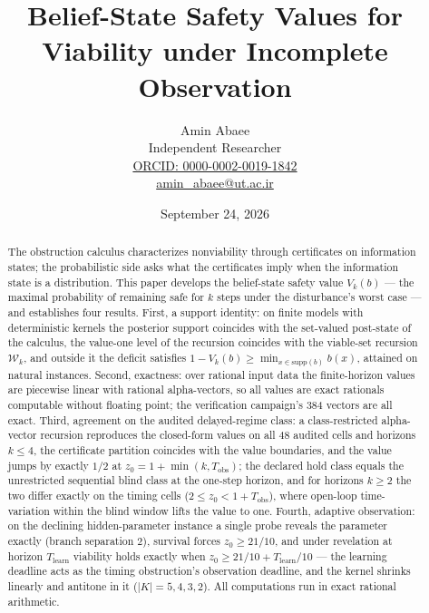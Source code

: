 \documentclass[10pt,twocolumn]{article}
\theoremstyle{plain}
\theoremstyle{definition}
\theoremstyle{remark}
\begin{document}
\title{Belief-State Safety Values for\\ Viability under Incomplete Observation}
\author{Amin Abaee\\[0.35em]
{\small Independent Researcher}\\[0.55em]
{\small\href{https://orcid.org/0000-0002-0019-1842}{ORCID: 0000-0002-0019-1842}}\\[0.3em]
{\small\href{mailto:amin\_abaee@ut.ac.ir}{amin\_abaee@ut.ac.ir}}}
\date{September 24, 2026}
\maketitle

\begin{abstract}
The obstruction calculus characterizes nonviability through certificates on
information states; the probabilistic side asks what the certificates imply
when the information state is a distribution. This paper develops the
belief-state safety value \(V_{k}(b)\) --- the maximal probability of
remaining safe for \(k\) steps under the disturbance's worst case --- and
establishes four results. First, a support identity: on finite models with
deterministic kernels the posterior support coincides with the set-valued
post-state of the calculus, the value-one level of the recursion coincides
with the viable-set recursion \(\mathcal{W}_{k}\), and outside it the
deficit satisfies \(1 - V_{k}(b) \ge \min_{x \in \mathrm{supp}(b)} b(x)\),
attained on natural instances. Second, exactness: over rational input data
the finite-horizon values are piecewise linear with rational alpha-vectors,
so all values are exact rationals computable without floating point; the
verification campaign's 384 vectors are all exact. Third, agreement on the
audited delayed-regime class: a class-restricted alpha-vector recursion
reproduces the closed-form values on all 48 audited cells and horizons
\(k \le 4\), the certificate partition coincides with the value
boundaries, and the value jumps by exactly \(1/2\) at
\(z_{0} = 1 + \min(k, T_{\mathrm{obs}})\); the declared hold class equals
the unrestricted sequential blind class at the one-step horizon, and for
horizons \(k \ge 2\) the two differ exactly on the timing cells
(\(2 \le z_{0} < 1 + T_{\mathrm{obs}}\)), where open-loop
time-variation within the blind window lifts the value to one. Fourth, adaptive
observation: on the declining hidden-parameter instance a single probe
reveals the parameter exactly (branch separation \(2\)), survival forces
\(z_{0} \ge 21/10\), and under revelation at horizon \(T_{\mathrm{learn}}\)
viability holds exactly when
\(z_{0} \ge 21/10 + T_{\mathrm{learn}}/10\) --- the learning deadline acts
as the timing obstruction's observation deadline, and the kernel shrinks
linearly and antitone in it (\(|K| = 5, 4, 3, 2\)). All computations run in
exact rational arithmetic.
\end{abstract}
\end{document}
